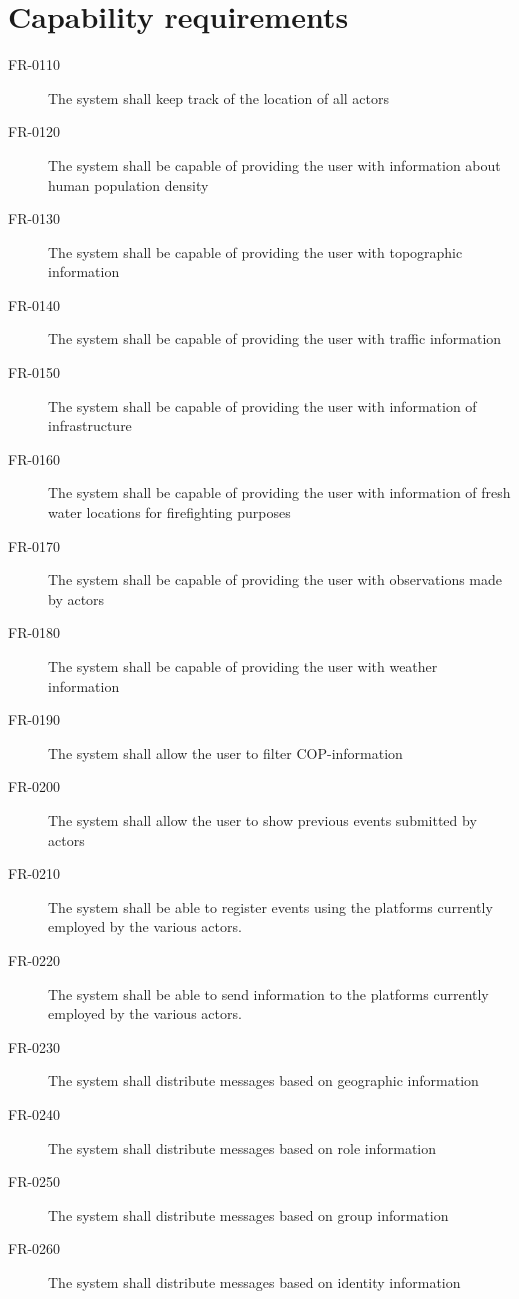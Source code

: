 \section{Capability requirements}

\begin{description}
  \item[FR-0110] The system shall keep track of the location of all actors 
  \item[FR-0120] The system shall be capable of providing the user with information about human population density
  \item[FR-0130] The system shall be capable of providing the user with topographic information
  \item[FR-0140] The system shall be capable of providing the user with traffic information
  \item[FR-0150] The system shall be capable of providing the user with information of infrastructure
  \item[FR-0160] The system shall be capable of providing the user with information of fresh water locations for firefighting purposes
 \item[FR-0170] The system shall be capable of providing the user with observations made by actors
\item[FR-0180] The system shall be capable of providing the user with weather information
\item[FR-0190] The system shall allow the user to filter COP-information
\item[FR-0200] The system shall allow the user to show previous events submitted by actors
\item[FR-0210] The system shall be able to register events using the platforms currently employed by the various actors.
\item[FR-0220] The system shall be able to send information to the platforms currently employed by the various actors.
\item[FR-0230] The system shall distribute messages based on geographic information
\item[FR-0240] The system shall distribute messages based on role information
\item[FR-0250] The system shall distribute messages based on group information
\item[FR-0260] The system shall distribute messages based on identity information


\end{description}